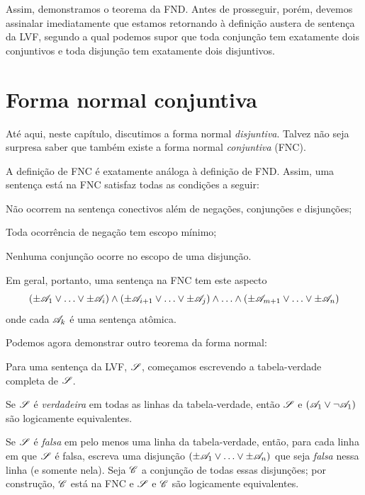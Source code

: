 Assim, demonstramos o teorema da FND. Antes de prosseguir, porém, devemos assinalar imediatamente que estamos retornando à definição austera de sentença da LVF, segundo a qual podemos supor que toda conjunção tem exatamente dois conjuntivos e toda disjunção tem exatamente dois disjuntivos.


\section{Forma normal conjuntiva}
\label{s:CNF}

Até aqui, neste capítulo, discutimos a forma normal \emph{disjuntiva}. Talvez não seja surpresa saber que também existe a forma normal \emph{conjuntiva} (FNC).

A definição de FNC é exatamente análoga à definição de FND. Assim, uma sentença está na FNC \emph{\ifeff} satisfaz todas as condições a seguir:
	\begin{compactlist}
		\item[(\textsc{cnf1})] Não ocorrem na sentença conectivos além de negações, conjunções e disjunções;
		\item[(\textsc{cnf2})] Toda ocorrência de negação tem escopo mínimo;
		\item[(\textsc{cnf3})] Nenhuma conjunção ocorre no escopo de uma disjunção.
	\end{compactlist}
Em geral, portanto, uma sentença na FNC tem este aspecto
	$$(\pm \mathscr{A}_1 \lor \ldots \lor \pm \mathscr{A}_i) \land (\pm \mathscr{A}_{i+1} \lor \ldots \lor \pm\mathscr{A}_j) \land \ldots \land (\pm\mathscr{A}_{m+1} \lor\ldots \lor \pm \mathscr{A}_n)$$
onde cada $\mathscr{A}_k$ é uma sentença atômica.

Podemos agora demonstrar outro teorema da forma normal:


	Para uma sentença da LVF, $\mathscr{S}$, começamos escrevendo a tabela-verdade completa de $\mathscr{S}$.

	Se $\mathscr{S}$ é \emph{verdadeira} em todas as linhas da tabela-verdade, então $\mathscr{S}$ e $(\mathscr{A}_1 \vee \neg \mathscr{A}_1)$ são logicamente equivalentes.

	Se $\mathscr{S}$ é \emph{falsa} em pelo menos uma linha da tabela-verdade, então, para cada linha em que $\mathscr{S}$ é falsa, escreva uma disjunção $(\pm\mathscr{A}_1 \vee \ldots \vee \pm\mathscr{A}_n)$ que seja \emph{falsa} nessa linha (e somente nela). Seja $\mathscr{C}$ a conjunção de todas essas disjunções; por construção, $\mathscr{C}$ está na FNC e $\mathscr{S}$ e $\mathscr{C}$ são logicamente equivalentes.

